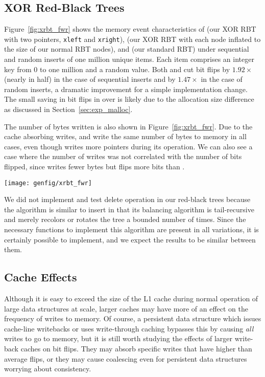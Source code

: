 \subsection{XOR Red-Black Trees}
Figure~\ref{fig:xrbt_fwr} shows the memory event characteristics of \xrbt (our XOR RBT with two
pointers, \texttt{xleft} and \texttt{xright}),
\xrbtbig (our XOR RBT with each node inflated to the size of our normal RBT nodes), and \rbt (our
standard RBT) under sequential and random inserts of one million unique items. Each item
comprises an integer key from 0 to one million and a random value.
Both \xrbt and \xrbtbig cut bit flips by $1.92\times$ (nearly in half)
in the case of sequential
inserts and by $1.47\times$ in the case of random inserts, a dramatic improvement for
a simple implementation change. The small saving in bit flips in \xrbtbig over
\xrbt is likely due to the allocation size difference as discussed in
Section~\ref{sec:exp_malloc}.

The number of bytes written is also shown in Figure~\ref{fig:xrbt_fwr}. Due to
the cache absorbing writes, \xrbtbig and \rbt write the same number of bytes to
memory in all cases, even though \rbt writes more pointers during its operation.
We can also see a case where the number of writes was not correlated with the
number of bits flipped, since \xrbt writes fewer bytes but flips more bits than
\xrbtbig.

\begin{SCfigure}
	\centering
	\texttt{[image: genfig/xrbt\_fwr]}
	\caption[XOR red-black trees characteristics]{Memory characteristics of XOR red-black trees compared to normal
		red-black trees.}
	\label{fig:xrbt_fwr}
\end{SCfigure}

We did not implement and test delete operation in our red-black trees because
the algorithm is similar to insert in that its balancing algorithm is
tail-recursive and merely recolors or rotates the tree a bounded number of times.
Since the necessary functions to implement this algorithm are present in all
variations, it is certainly possible to implement, and we expect the results to be similar
between them.

\subsection{Cache Effects}
\label{sec:exp_cache}

Although it is easy to exceed the size of the L1 cache during normal operation
of large data structures at scale, larger caches may have more of an effect on
the frequency of writes to memory. Of course, a persistent data structure which
issues cache-line writebacks or uses write-through caching bypasses this by
causing \textit{all} writes to go to memory, but it is still worth studying the effects of larger write-back
caches on bit flips. They may absorb specific writes that have higher
than average flips, or they may cause coalescing even for persistent data
structures worrying about consistency.

